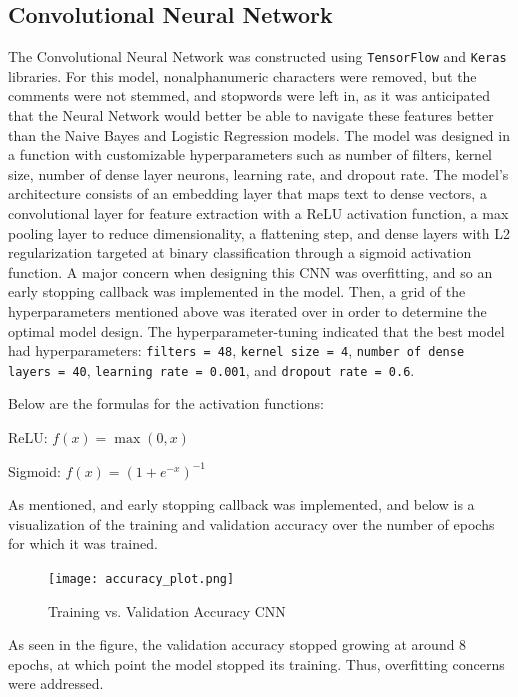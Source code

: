 \documentclass[twocolumn]{article}
\begin{document}
\subsection{Convolutional Neural Network}
The Convolutional Neural Network was constructed using \texttt{TensorFlow} and \texttt{Keras} libraries. For this model, nonalphanumeric characters were removed, but the comments were not stemmed, and stopwords were left in, as it was anticipated that the Neural Network would better be able to navigate these features better than the Naive Bayes and Logistic Regression models. The model was designed in a function with customizable hyperparameters such as number of filters, kernel size, number of dense layer neurons, learning rate, and dropout rate. The model's architecture consists of an embedding layer that maps text to dense vectors, a convolutional layer for feature extraction with a ReLU activation function, a max pooling layer to reduce dimensionality, a flattening step, and dense layers with L2 regularization targeted at binary classification through a sigmoid activation function. A major concern when designing this CNN was overfitting, and so an early stopping callback was implemented in the model. Then, a grid of the hyperparameters mentioned above was iterated over in order to determine the optimal model design. The hyperparameter-tuning indicated that the best model had hyperparameters: \texttt{filters = 48}, \texttt{kernel size = 4}, \texttt{number of dense layers = 40}, \texttt{learning rate = 0.001}, and \texttt{dropout rate = 0.6}.

Below are the formulas for the activation functions:

\begin{center}
ReLU: \(f(x) = \max(0, x)\)
\end{center}

\begin{center}
Sigmoid: \( f(x) = (1 + e^{-x})^{-1} \)
\end{center}

As mentioned, and early stopping callback was implemented, and below is a visualization of the training and validation accuracy over the number of epochs for which it was trained.

\begin{figure}[H]
    \centering
    \texttt{[image: accuracy\_plot.png]}
    \caption{Training vs. Validation Accuracy CNN}
\end{figure}

As seen in the figure, the validation accuracy stopped growing at around 8 epochs, at which point the model stopped its training. Thus, overfitting concerns were addressed.
\end{document}
